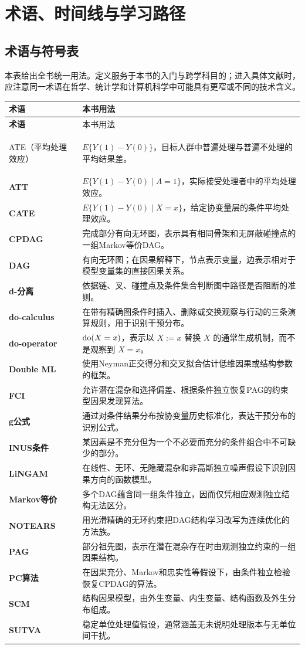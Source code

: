 \chapter{术语、时间线与学习路径}
\label{app:learning-tools}

\section{术语与符号表}

本表给出全书统一用法。定义服务于本书的入门与跨学科目的；进入具体文献时，应注意同一术语在哲学、统计学和计算机科学中可能具有更窄或不同的技术含义。

\small
\begin{longtable}{>{\bfseries}p{}p{}}
\toprule
术语 & 本书用法\\
\midrule
\endfirsthead
\toprule
术语 & 本书用法\\
\midrule
\endhead

ATE（平均处理效应） & $E\{Y(1)-Y(0)\}$，目标人群中普遍处理与普遍不处理的平均结果差。\\
ATT & $E\{Y(1)-Y(0)\mid A=1\}$，实际接受处理者中的平均处理效应。\\
CATE & $E\{Y(1)-Y(0)\mid X=x\}$，给定协变量层的条件平均处理效应。\\
CPDAG & 完成部分有向无环图，表示具有相同骨架和无屏蔽碰撞点的一组Markov等价DAG。\\
DAG & 有向无环图；在因果解释下，节点表示变量，边表示相对于模型变量集的直接因果关系。\\
d-分离 & 依据链、叉、碰撞点及条件集合判断图中路径是否阻断的准则。\\
do-calculus & 在带有精确图条件时插入、删除或交换观察与行动的三条演算规则，用于识别干预分布。\\
do-operator & $\operatorname{do}(X=x)$，表示以 $X:=x$ 替换 $X$ 的通常生成机制，而不是观察到 $X=x$。\\
Double ML & 使用Neyman正交得分和交叉拟合估计低维因果或结构参数的框架。\\
FCI & 允许潜在混杂和选择偏差、根据条件独立恢复PAG的约束型因果发现算法。\\
g公式 & 通过对条件结果分布按协变量历史标准化，表达干预分布的识别公式。\\
INUS条件 & 某因素是不充分但为一个不必要而充分的条件组合中不可缺少的部分。\\
LiNGAM & 在线性、无环、无隐藏混杂和非高斯独立噪声假设下识别因果方向的函数模型。\\
Markov等价 & 多个DAG蕴含同一组条件独立，因而仅凭相应观测独立结构无法区分。\\
NOTEARS & 用光滑精确的无环约束把DAG结构学习改写为连续优化的方法族。\\
PAG & 部分祖先图，表示在潜在混杂存在时由观测独立约束的一组因果结构。\\
PC算法 & 在因果充分、Markov和忠实性等假设下，由条件独立检验恢复CPDAG的算法。\\
SCM & 结构因果模型，由外生变量、内生变量、结构函数及外生分布组成。\\
SUTVA & 稳定单位处理值假设，通常涵盖无未说明处理版本与无单位间干扰。\\


\end{longtable}
